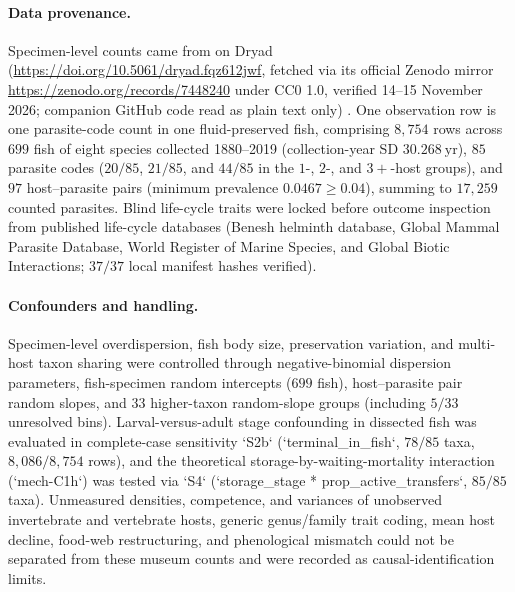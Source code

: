 \paragraph{Data provenance.}
Specimen-level counts came from \citet{wood2023} on Dryad (\url{https://doi.org/10.5061/dryad.fqz612jwf}, fetched via its official Zenodo mirror \url{https://zenodo.org/records/7448240} under CC0 1.0, verified 14--15 November 2026; companion GitHub code read as plain text only) \citep{wood2022}. One observation row is one parasite-code count in one fluid-preserved fish, comprising $8{,}754$ rows across $699$ fish of eight species collected 1880--2019 (collection-year SD $30.268\ \mathrm{yr}$), $85$ parasite codes ($20/85$, $21/85$, and $44/85$ in the $1$-, $2$-, and $3+$-host groups), and $97$ host--parasite pairs (minimum prevalence $0.0467 \ge 0.04$), summing to $17{,}259$ counted parasites. Blind life-cycle traits were locked before outcome inspection from published life-cycle databases (Benesh helminth database, Global Mammal Parasite Database, World Register of Marine Species, and Global Biotic Interactions; $37/37$ local manifest hashes verified).

\paragraph{Confounders and handling.}
Specimen-level overdispersion, fish body size, preservation variation, and multi-host taxon sharing were controlled through negative-binomial dispersion parameters, fish-specimen random intercepts ($699$ fish), host--parasite pair random slopes, and $33$ higher-taxon random-slope groups (including $5/33$ unresolved bins). Larval-versus-adult stage confounding in dissected fish was evaluated in complete-case sensitivity `S2b` (`terminal\_in\_fish`, $78/85$ taxa, $8{,}086/8{,}754$ rows), and the theoretical storage-by-waiting-mortality interaction (`mech-C1h`) was tested via `S4` (`storage\_stage * prop\_active\_transfers`, $85/85$ taxa). Unmeasured densities, competence, and variances of unobserved invertebrate and vertebrate hosts, generic genus/family trait coding, mean host decline, food-web restructuring, and phenological mismatch could not be separated from these museum counts and were recorded as causal-identification limits.

